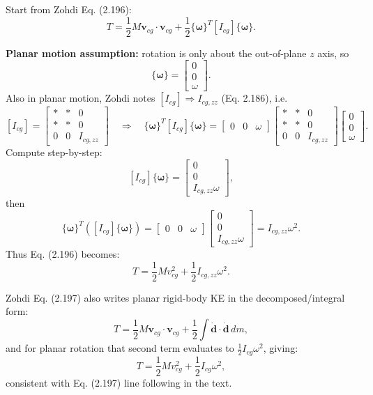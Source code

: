 \documentclass[12pt]{article}
\begin{document}
Start from Zohdi Eq. (2.196):
\[
T = \frac12 M\bm v_{cg}\cdot \bm v_{cg}
  + \frac12 \{\bm\omega\}^T [I_{cg}] \{\bm\omega\}.
\]

\textbf{Planar motion assumption:}
rotation is only about the out-of-plane $z$ axis, so
\[
\{\bm\omega\} =
\begin{bmatrix}
0\\
0\\
\omega
\end{bmatrix}.
\]
Also in planar motion, Zohdi notes $[I_{cg}] \Rightarrow I_{cg,zz}$ (Eq. 2.186), i.e.
\[
[I_{cg}] =
\begin{bmatrix}
\ast & \ast & 0\\
\ast & \ast & 0\\
0 & 0 & I_{cg,zz}
\end{bmatrix}
\quad\Rightarrow\quad
\{\bm\omega\}^T [I_{cg}] \{\bm\omega\}
=
\begin{bmatrix}
0 & 0 & \omega
\end{bmatrix}
\begin{bmatrix}
\ast & \ast & 0\\
\ast & \ast & 0\\
0 & 0 & I_{cg,zz}
\end{bmatrix}
\begin{bmatrix}
0\\
0\\
\omega
\end{bmatrix}.
\]
Compute step-by-step:
\[
[I_{cg}]\{\bm\omega\}
=
\begin{bmatrix}
0\\
0\\
I_{cg,zz}\omega
\end{bmatrix},
\]
then
\[
\{\bm\omega\}^T([I_{cg}]\{\bm\omega\})
=
\begin{bmatrix}
0 & 0 & \omega
\end{bmatrix}
\begin{bmatrix}
0\\
0\\
I_{cg,zz}\omega
\end{bmatrix}
=
I_{cg,zz}\omega^2.
\]
Thus Eq. (2.196) becomes:
\[
T = \frac12 M v_{cg}^2 + \frac12 I_{cg,zz}\omega^2.
\]

Zohdi Eq. (2.197) also writes planar rigid-body KE in the decomposed/integral form:
\[
T = \frac12 M\bm v_{cg}\cdot\bm v_{cg} + \frac12 \int \dot{\bm d}\cdot\dot{\bm d}\,dm,
\]
and for planar rotation that second term evaluates to $\frac12 I_{cg}\omega^2$, giving:
\[
T = \frac12 M v_{cg}^2 + \frac12 I_{cg}\omega^2,
\]
consistent with Eq. (2.197) line following in the text.
\end{document}
